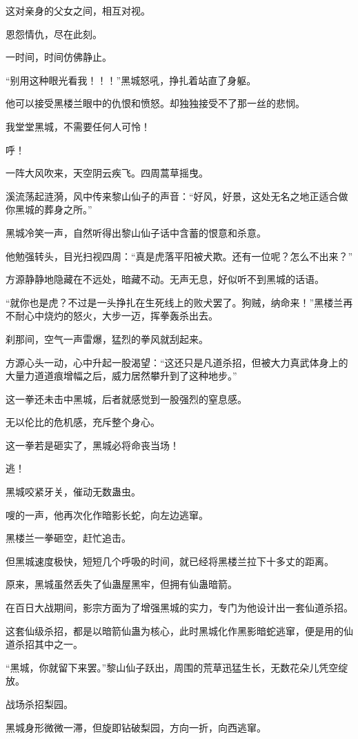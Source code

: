 \begin{this_body}
这对亲身的父女之间，相互对视。

恩怨情仇，尽在此刻。

一时间，时间仿佛静止。

“别用这种眼光看我！！！”黑城怒吼，挣扎着站直了身躯。

他可以接受黑楼兰眼中的仇恨和愤怒。却独独接受不了那一丝的悲悯。

我堂堂黑城，不需要任何人可怜！

呼！

一阵大风吹来，天空阴云疾飞。四周蒿草摇曳。

溪流荡起涟漪，风中传来黎山仙子的声音：“好风，好景，这处无名之地正适合做你黑城的葬身之所。”

黑城冷笑一声，自然听得出黎山仙子话中含蓄的恨意和杀意。

他勉强转头，目光扫视四周：“真是虎落平阳被犬欺。还有一位呢？怎么不出来？”

方源静静地隐藏在不远处，暗藏不动。无声无息，好似听不到黑城的话语。

“就你也是虎？不过是一头挣扎在生死线上的败犬罢了。狗贼，纳命来！”黑楼兰再不耐心中烧灼的怒火，大步一迈，挥拳轰杀出去。

刹那间，空气一声雷爆，猛烈的拳风就刮起来。

方源心头一动，心中升起一股渴望：“这还只是凡道杀招，但被大力真武体身上的大量力道道痕增幅之后，威力居然攀升到了这种地步。”

这一拳还未击中黑城，后者就感觉到一股强烈的窒息感。

无以伦比的危机感，充斥整个身心。

这一拳若是砸实了，黑城必将命丧当场！

逃！

黑城咬紧牙关，催动无数蛊虫。

嗖的一声，他再次化作暗影长蛇，向左边逃窜。

黑楼兰一拳砸空，赶忙追击。

但黑城速度极快，短短几个呼吸的时间，就已经将黑楼兰拉下十多丈的距离。

原来，黑城虽然丢失了仙蛊屋黑牢，但拥有仙蛊暗箭。

在百日大战期间，影宗方面为了增强黑城的实力，专门为他设计出一套仙道杀招。

这套仙级杀招，都是以暗箭仙蛊为核心，此时黑城化作黑影暗蛇逃窜，便是用的仙道杀招其中之一。

“黑城，你就留下来罢。”黎山仙子跃出，周围的荒草迅猛生长，无数花朵儿凭空绽放。

战场杀招梨园。

黑城身形微微一滞，但旋即钻破梨园，方向一折，向西逃窜。


\end{this_body}
